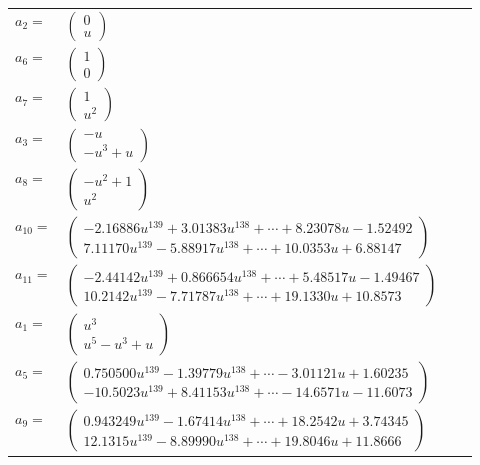 \documentclass[1p]{elsarticle_modified}
\theoremstyle{definition}
\begin{document}
\begin{tabular}{m{7pt} m{180pt} m{7pt} m{180pt} }
\flushright $a_{2}=$&$\begin{pmatrix}0\\u\end{pmatrix}$ \\
\flushright $a_{6}=$&$\begin{pmatrix}1\\0\end{pmatrix}$ \\
\flushright $a_{7}=$&$\begin{pmatrix}1\\u^2\end{pmatrix}$ \\
\flushright $a_{3}=$&$\begin{pmatrix}- u\\- u^3+u\end{pmatrix}$ \\
\flushright $a_{8}=$&$\begin{pmatrix}- u^2+1\\u^2\end{pmatrix}$ \\
\flushright $a_{10}=$&$\begin{pmatrix}-2.16886 u^{139}+3.01383 u^{138}+\cdots+8.23078 u-1.52492\\7.11170 u^{139}-5.88917 u^{138}+\cdots+10.0353 u+6.88147\end{pmatrix}$ \\
\flushright $a_{11}=$&$\begin{pmatrix}-2.44142 u^{139}+0.866654 u^{138}+\cdots+5.48517 u-1.49467\\10.2142 u^{139}-7.71787 u^{138}+\cdots+19.1330 u+10.8573\end{pmatrix}$ \\
\flushright $a_{1}=$&$\begin{pmatrix}u^3\\u^5- u^3+u\end{pmatrix}$ \\
\flushright $a_{5}=$&$\begin{pmatrix}0.750500 u^{139}-1.39779 u^{138}+\cdots-3.01121 u+1.60235\\-10.5023 u^{139}+8.41153 u^{138}+\cdots-14.6571 u-11.6073\end{pmatrix}$ \\
\flushright $a_{9}=$&$\begin{pmatrix}0.943249 u^{139}-1.67414 u^{138}+\cdots+18.2542 u+3.74345\\12.1315 u^{139}-8.89990 u^{138}+\cdots+19.8046 u+11.8666\end{pmatrix}$ \\

\end{tabular}
\end{document}
